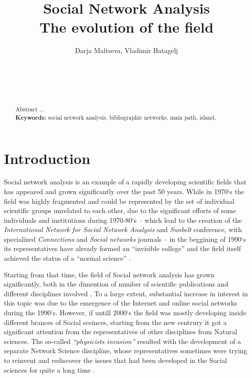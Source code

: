 \documentclass[11pt]{article} %
\title{\LARGE\textbf{Social Network Analysis}\protect\\ The evolution of the field}
\author{%
Darja Maltseva\affmark[1], Vladimir Batagelj\affmark[1,2,3]\\
\affaddr{\affmark[1]NRU HSE Moscow}\\
\affaddr{\affmark[2]IMFM Ljubljana}\\
\affaddr{\affmark[3]IAM UP Koper}\\ \email{d.maltseva@gmail.com}\\
\email{vladimir.batagelj@fmf.uni-lj.si} %
}
\begin{document}

\maketitle

\begin{abstract}
Abstract ...
\\[4pt]
\textbf{Keywords:}  social network analysis, bibliographic networks, main path,  island,
\end{abstract}



\section{Introduction}

Social network analysis is an example of a rapidly developing scientific fields that has appeared and grown significantly over the past 50 years. While in 1970`s the field was highly fragmented and could be represented by the set of individual scientific groups unrelated to each other, due to the significant efforts of some individuals and institutions during 1970-80`s -- which lead to the creation of the \textit{International Network for Social Network Analysis} and \textit{Sunbelt} conference, with specialized \textit{Connections} and \textit{Social networks} journals -- in the beggining of 1990`s its representatives have already formed an “invisible college” and the field itself achieved the status of a “normal science” \citep{SNAdev,normSci}. \medskip 

Starting from that time, the field of Social network analysis has grown significantly, both in the dimention of number of  scientific publications and different disciplines involved \citep{SNAinf, borgatti}. To a large extent, substantial increase in interest in this topic was due to the emergence of the Internet and online social networks during the 1990`s. However, if untill 2000`s the field was mostly developing inside different brances of Social sceinces, starting from the new centrury it got a significant attention from the representatives of other disciplines from Natural sciences. The so-called \textit{``physicists invasion''} \citep{Understand} resulted with the development of a separate Network Science discipline, whose representatives sometimes were trying to reinvent and rediscover the issues that had been developed in the Social sciences for quite a long time \citep{SNAdev}.  \medskip 
 
\end{document}
